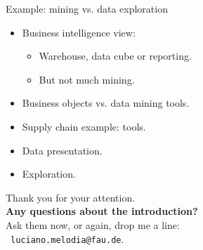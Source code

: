 \documentclass[aspectratio=169,t]{beamer}
\begin{document}
  { 
    \begin{frame}{Example: mining vs. data exploration}
    \begin{itemize}
        \item Business intelligence view:
        \begin{itemize}
            \item Warehouse, data cube or reporting.
            \item But not much mining.
        \end{itemize}
        \item Business objects vs. data mining tools.
        \item Supply chain example: tools.
        \item Data presentation.
        \item Exploration.
    \end{itemize}
    \end{frame}
  }

  { %
    \begin{frame}[c]
      \begin{center}
        Thank you for your attention.\\
        {\bf Any questions about the introduction?}\\[0.5cm]
        Ask them now, or again, drop me a line: \\ 
        \faSendO \ \texttt{luciano.melodia@fau.de}.
      \end{center}
    \end{frame}
  }
\end{document}
